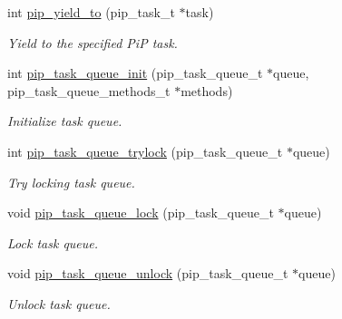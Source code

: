 \begin{DoxyCompactItemize}
\item 
int \hyperlink{group__libpip_gac30cf124b28a8d80dac34c5e1bdb66ba}{pip\-\_\-yield\-\_\-to} (pip\-\_\-task\-\_\-t $\ast$task)
\begin{DoxyCompactList}\small\item\em Yield to the specified Pi\-P task. \end{DoxyCompactList}\end{DoxyCompactItemize}
\begin{DoxyCompactItemize}
\item 
int \hyperlink{group__libpip_ga9c50d9b2b810d97a75a5fe9c332902e0}{pip\-\_\-task\-\_\-queue\-\_\-init} (pip\-\_\-task\-\_\-queue\-\_\-t $\ast$queue, pip\-\_\-task\-\_\-queue\-\_\-methods\-\_\-t $\ast$methods)
\begin{DoxyCompactList}\small\item\em Initialize task queue. \end{DoxyCompactList}\end{DoxyCompactItemize}
\begin{DoxyCompactItemize}
\item 
int \hyperlink{group__libpip_ga20d50746c585f1ede68f2c9aefc39a5c}{pip\-\_\-task\-\_\-queue\-\_\-trylock} (pip\-\_\-task\-\_\-queue\-\_\-t $\ast$queue)
\begin{DoxyCompactList}\small\item\em Try locking task queue. \end{DoxyCompactList}\end{DoxyCompactItemize}
\begin{DoxyCompactItemize}
\item 
void \hyperlink{group__libpip_gaf7f6e26e29752a148704108bdcc7756f}{pip\-\_\-task\-\_\-queue\-\_\-lock} (pip\-\_\-task\-\_\-queue\-\_\-t $\ast$queue)
\begin{DoxyCompactList}\small\item\em Lock task queue. \end{DoxyCompactList}\end{DoxyCompactItemize}
\begin{DoxyCompactItemize}
\item 
void \hyperlink{group__libpip_gaf4cfe9905f1862718f65ba2fda961b84}{pip\-\_\-task\-\_\-queue\-\_\-unlock} (pip\-\_\-task\-\_\-queue\-\_\-t $\ast$queue)
\begin{DoxyCompactList}\small\item\em Unlock task queue. \end{DoxyCompactList}\end{DoxyCompactItemize}
